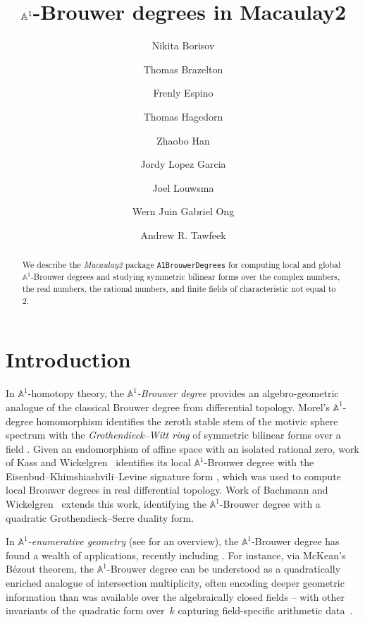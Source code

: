 \documentclass[12pt]{amsart}
\title{$\A^1$-Brouwer degrees in Macaulay2}
\author{Nikita Borisov}
\author{Thomas Brazelton}
\author{Frenly Espino}
\author{Thomas Hagedorn}
\author{Zhaobo Han}
\author{Jordy Lopez Garcia}
\author{Joel Louwsma}
\author{Wern Juin Gabriel Ong}
\author{Andrew R. Tawfeek}
\theoremstyle{definition}
\providecommand{\A}{\mathbb{A}}
\begin{document}
\begin{abstract}
We describe the \emph{Macaulay2} package \texttt{A1BrouwerDegrees} for computing local and global $\mathbb{A}^1$-Brouwer degrees and studying symmetric bilinear forms over the complex numbers, the real numbers, the rational numbers, and finite fields of characteristic not equal to~$2$. 
\end{abstract}%

\maketitle

\section{Introduction}

In $\A^1$-homotopy theory, the \emph{$\A^1$-Brouwer degree} provides an algebro-geometric analogue of the classical Brouwer degree from differential topology. Morel's $\A^1$-degree homomorphism identifies the zeroth stable stem of the motivic sphere spectrum with the \emph{Grothendieck--Witt ring} of symmetric bilinear forms over a field \cite[Corollary~1.24]{Morel}. Given an endomorphism of affine space with an isolated rational zero, work of Kass and Wickelgren~\cite{KW-EKL} identifies its local $\A^1$-Brouwer degree with the Eisenbud--Khimshiashvili--Levine signature form \cite{EL,Khim}, which was used to compute local Brouwer degrees in real differential topology. Work of Bachmann and Wickelgren~\cite{BW} extends this work, identifying the $\A^1$-Brouwer degree with a quadratic Grothendieck--Serre duality form.

In \emph{$\A^1$-enumerative geometry} \cite{CubicKW,Levine} (see \cite{Braz-expos,Pauli-expos} for an overview), the $\A^1$-Brouwer degree has found a wealth of applications, recently including \cite{AK,KSLW,JPP}. For instance, via McKean's B\'ezout theorem, the $\A^1$-Brouwer degree can be understood as a quadratically enriched analogue of intersection multiplicity, often encoding deeper geometric information than was available over the algebraically closed fields -- with other invariants of the quadratic form over~$k$ capturing field-specific arithmetic data~\cite{McKean}.
\end{document}

